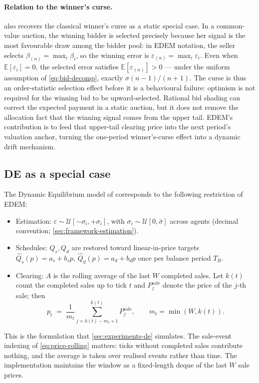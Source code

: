 \paragraph{Relation to the winner's curse.}
 also recovers the classical winner's curse
\citep{thaler1988winners} as a static special case. In a
common-value auction, the winning bidder is selected precisely
because her signal is the most favourable draw among the bidder
pool: in EDEM notation, the seller selects
$\beta_{(n)} = \max_{i} \beta_{i}$, so the winning error is
$\varepsilon_{(n)} = \max_{i} \varepsilon_{i}$. Even when
$\mathbb{E}[\varepsilon_{i}] = 0$, the selected error satisfies
$\mathbb{E}[\varepsilon_{(n)}] > 0$ --- under the uniform
assumption of \cref{eq:bid-decomp}, exactly $\sigma(n-1)/(n+1)$.
The curse is thus an order-statistic selection effect before it is
a behavioural failure: optimism is not required for the winning
bid to be upward-selected. Rational bid shading can correct the
expected payment in a static auction, but it does not remove the
allocation fact that the winning signal comes from the upper tail.
EDEM's contribution is to feed that upper-tail clearing price into
the next period's valuation anchor, turning the one-period
winner's-curse effect into a dynamic drift mechanism.

\subsection{DE as a special case}
\label{sec:framework-de-special}

The Dynamic Equilibrium model of \citet{arbuzov2018de} corresponds to
the following restriction of EDEM:
\begin{itemize}[leftmargin=*,nosep]
\item Estimation: $\varepsilon \sim \mathcal{U}[-\sigma_{i}, +\sigma_{i}]$,
      with $\sigma_{i} \sim \mathcal{U}[0, \bar{\sigma}]$ across agents
      (decimal convention; \cref{sec:framework-estimation}).
\item Schedules: $Q_{s}, Q_{d}$ are restored toward linear-in-price
      targets $\hat{Q}_{s}(p) = a_{s} + b_{s} p$,
      $\hat{Q}_{d}(p) = a_{d} + b_{d} p$ once per balance period $T_{B}$.
\item Clearing: $A$ is the rolling average of the last $W$ completed
      sales. Let $k(t)$ count the completed sales up to tick $t$ and
      $P^{\mathrm{sale}}_{j}$ denote the price of the $j$-th sale; then
      \begin{equation}
      \label{eq:price-rolling}
      p_{t} \;=\; \frac{1}{m_{t}} \sum_{j=k(t)-m_{t}+1}^{k(t)} P^{\mathrm{sale}}_{j},
      \qquad m_{t} = \min(W, k(t)).
      \end{equation}
\end{itemize}
This is the formulation that \cref{sec:experiments-de} simulates. The
sale-event indexing of \cref{eq:price-rolling} matters: ticks without
completed sales contribute nothing, and the average is taken over
realised events rather than time. The implementation maintains the
window as a fixed-length deque of the last $W$ sale prices.

